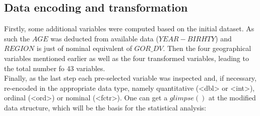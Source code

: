 \documentclass[12pt]{article}
\begin{document}
\subsection{Data encoding and transformation}
Firstly, some additional variables were computed based on the initial dataset. As such the $AGE$ was deducted from available data ($YEAR-BIRHTY$) and $REGION$ is just of nominal equivalent of $GOR\_DV$. Then the four geographical variables mentioned earlier as well as the four transformed variables, leading to the total number fo 43 variables.\\
Finally, as the last step each pre-selected variable was inspected and, if necessary, re-encoded in the appropriate data type, namely quantitative (<dbl> or <int>), ordinal (<ord>) or nominal (<fctr>). One can get a $glimpse()$ at the modified data structure, which will be the basis for the statistical analysis:\\
\end{document}

